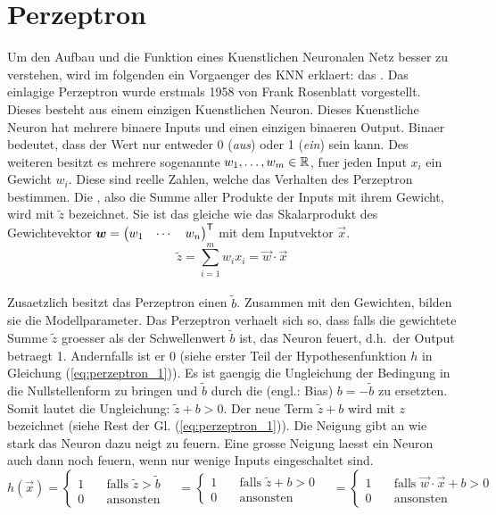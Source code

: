 \section{Perzeptron}
Um den Aufbau und die Funktion eines Kuenstlichen Neuronalen Netz besser zu
verstehen, wird im folgenden ein Vorgaenger des KNN erklaert: das .
\para{}
Das einlagige Perzeptron wurde erstmals 1958 von Frank Rosenblatt vorgestellt. Dieses
besteht aus einem einzigen Kuenstlichen Neuron. Dieses Kuenstliche Neuron
hat mehrere binaere Inputs und einen einzigen binaeren Output. Binaer
bedeutet, dass der Wert nur entweder 0 (\textit{aus}) oder 1 (\textit{ein}) sein
kann. Des weiteren besitzt es mehrere sogenannte  $w_1, \ldots,
w_m \in \mathbb{R}$, fuer jeden Input $x_i$ ein Gewicht $w_i$.
Diese sind reelle Zahlen, welche das Verhalten des Perzeptron bestimmen.
Die , also die Summe aller Produkte der Inputs mit
ihrem Gewicht, wird mit $\tilde{z}$ bezeichnet.
Sie ist das gleiche wie das Skalarprodukt des Gewichtevektor
$\bm{w} = \begin{pmatrix} w_1 & \cdots & w_n \end{pmatrix}^{\mathsf{T}}$ mit dem
Inputvektor $\vec{x}$. \\
\begin{equation*}
  \tilde{z} = \sum_{i=1}^{m} w_i x_i = \vec{w} \cdot \vec{x}
\end{equation*} \\
Zusaetzlich besitzt das Perzeptron einen  $\tilde{b}$.
Zusammen mit den Gewichten, bilden sie die Modellparameter.
Das Perzeptron verhaelt sich so, dass falls die gewichtete Summe $\tilde{z}$ groesser als der
Schwellenwert $\tilde{b}$ ist, das Neuron feuert, d.h.\ der Output betraegt 1.
Andernfalls ist er 0 (siehe erster Teil der Hypothesenfunktion $h$ in Gleichung (\ref{eq:perzeptron_1})).
Es ist gaengig die Ungleichung der Bedingung in die Nullstellenform zu bringen
und $\tilde{b}$ durch die  (engl.: Bias)
$b = -\tilde{b}$ zu ersetzten. Somit lautet die Ungleichung: $\tilde{z} + b
> 0$. Der neue Term $\tilde{z} + b$ wird mit $z$ bezeichnet (siehe Rest der Gl. (\ref{eq:perzeptron_1})).
Die Neigung gibt an wie stark das Neuron dazu neigt zu feuern. Eine grosse
Neigung laesst ein Neuron auch dann noch feuern, wenn nur wenige Inputs
eingeschaltet sind. \\
\begin{equation}\label{eq:perzeptron_1}
  h(\vec{x}) =
  \begin{cases}
    1 & \quad \text{falls } \tilde{z} > \tilde{b}\\
    0 & \quad \text{ansonsten}
  \end{cases}
  \quad =
  \begin{cases}
    1 & \quad \text{falls } \tilde{z} + b > 0\\
    0 & \quad \text{ansonsten}
  \end{cases}
  \quad =
  \begin{cases}
    1 & \quad\text{falls } \vec{w} \cdot \vec{x} + b > 0\\
    0 & \quad\text{ansonsten}
  \end{cases}
\end{equation}
